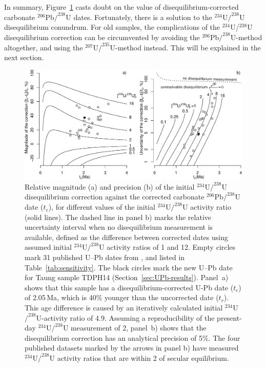 \documentclass[11pt]{article}
\begin{document}
In summary, Figure~\ref{fig:sensitivity} casts doubt on the value of
disequilibrium-corrected carbonate ${}^{206}$Pb${/}^{238}$U dates.
Fortunately, there is a solution to the ${}^{234}$U${/}^{238}$U
disequilibrium conundrum. For old samples, the complications of the
${}^{234}$U/${}^{238}$U disequilibrium correction can be circumvented
by avoiding the ${}^{206}$Pb${/}^{238}$U-method altogether, and using
the ${}^{207}$U${/}^{235}$U-method instead.  This will be explained in
the next section.\medskip

\begin{figure}[!ht]
  \centering
  \includegraphics[width=\textwidth]{CradleAccuracyPrecision.pdf}
  \caption{Relative magnitude (a) and precision (b) of the initial
    ${}^{234}$U${/}^{238}$U disequilibrium correction against the
    corrected carbonate ${}^{206}$Pb${/}^{238}$U date ($t_c$), for
    different values of the initial ${}^{234}$U${/}^{238}$U activity
    ratio (solid lines).  The dashed line in panel b) marks the
    relative uncertainty interval when no disequilibrium measurement
    is available, defined as the difference between corrected dates
    using assumed initial ${}^{234}$U${/}^{238}$U activity ratios of 1
    and 12. Empty circles mark 31 published U--Pb dates from
    \citet{walker2006}, \citet{dirks2010} and \citet{pickering2019}
    listed in Table~\ref{tab:sensitivity}. The black circles mark the
    new U--Pb date for Taung sample TDPH14
    (Section~\ref{sec:UPb-results}).  Panel~a) shows that this sample
    has a disequilibrium-corrected U-Pb date ($t_c$) of 2.05\,Ma,
    which is 40\% younger than the uncorrected date ($t_r$). This age
    difference is caused by an iteratively calculated initial
    ${}^{234}$U${/}^{238}$U-activity ratio of 4.9.  Assuming a
    reproducibility of the present-day ${}^{234}$U${/}^{238}$U
    measurement of 2\permil, panel~b) shows that the disequilibrium
    correction has an analytical precision of 5\%. The four published
    datasets marked by the arrows in panel b) have measured
    ${}^{234}$U${/}^{238}$U activity ratios that are within {2\permil}
    of secular equilibrium.}
  \label{fig:sensitivity}
\end{figure}
\end{document}
